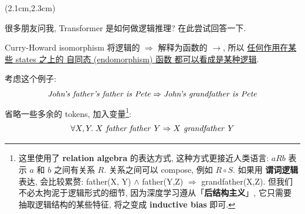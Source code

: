 \begin{preview}

\cc{
\title{\vspace{-1.5cm} \bfseries\color{blue}{\Large Transformer 的逻辑解释}}
}{
\title{\vspace{-1.5cm} \bfseries\color{blue}{\Large Transformer as Logic}}
}

\date{\vspace{-2cm}} %

\maketitle

\setcounter{section}{-1}

\begin{textblock*}{5cm}(2.1cm,2.3cm) %
{}
\end{textblock*}

\begin{minipage}{\textwidth}
\setlength{\parskip}{0.4\baselineskip}

很多朋友问我, Transformer 是如何做逻辑推理? 在此尝试回答一下.

Curry-Howard isomorphism 将逻辑的 $\Rightarrow$ 解释为函数的 $\rightarrow$, 所以 \uline{任何作用在某些 states 之上的 自同态 (endomorphism) 函数 都可以看成是某种逻辑}.

考虑这个例子:
\begin{equation}
\text{\textit{John's father's father is Pete}} \Rightarrow \text{\textit{John's grandfather is Pete}}
\end{equation}
省略一些多余的 tokens, 加入变量\footnote{这里使用了 \textbf{relation algebra} 的表达方式, 这种方式更接近人类语言: $a R b$ 表示 $a$ 和 $b$ 之间有关系 $R$.  关系之间可以 compose, 例如 $R \circ S$.  如果用 \textbf{谓词逻辑} 表达, 会比较累赘: father(X, Y) $\wedge$ father(Y,Z) $\Rightarrow$ grandfather(X,Z).  但我们不必太拘泥于逻辑形式的细节, 因为深度学习遵从「\textbf{后结构主义}」, 它只需要 抽取逻辑结构的某些特征, 将之变成 \textbf{inductive bias} 即可.}:
\begin{equation}
\forall X, Y. \;  X \text{\textit{ father father }} Y \Rightarrow X \text{\textit{ grandfather }} Y
\end{equation}


\end{minipage}
\end{preview}
